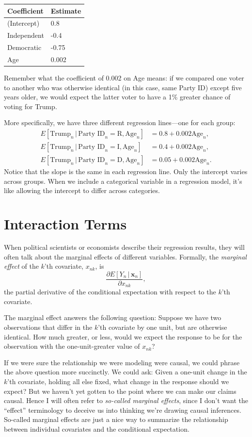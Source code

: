 \documentclass[
  12pt,
  oneside,openany]{book}
\begin{document}
\begin{longtable}[]{@{}ll@{}}
\toprule
Coefficient & Estimate\tabularnewline
\midrule
\endhead
(Intercept) & 0.8\tabularnewline
Independent & -0.4\tabularnewline
Democratic & -0.75\tabularnewline
Age & 0.002\tabularnewline
\bottomrule
\end{longtable}

Remember what the coefficient of 0.002 on Age means: if we compared one voter to another who was otherwise identical (in this case, same Party ID) except five years older, we would expect the latter voter to have a 1\% greater chance of voting for Trump.

More specifically, we have three different regression lines---one for each group:
\[
\begin{aligned}
  E[\text{Trump}_n \,|\, \text{Party ID}_n = \text{R}, \text{Age}_n] &= 0.8 + 0.002 \text{Age}_n, \\
  E[\text{Trump}_n \,|\, \text{Party ID}_n = \text{I}, \text{Age}_n] &= 0.4 + 0.002 \text{Age}_n, \\
  E[\text{Trump}_n \,|\, \text{Party ID}_n = \text{D}, \text{Age}_n] &= 0.05 + 0.002 \text{Age}_n.
\end{aligned}
\]
Notice that the slope is the same in each regression line. Only the intercept varies across groups. When we include a categorical variable in a regression model, it's like allowing the intercept to differ across categories.

\hypertarget{interaction-terms}{%
\section{Interaction Terms}\label{interaction-terms}}

When political scientists or economists describe their regression results, they will often talk about the marginal effects of different variables. Formally, the \emph{marginal effect} of the \(k\)'th covariate, \(x_{nk}\), is
\[
\frac{\partial{}E[Y_n \,|\, \mathbf{x}_n]}{\partial{}x_{nk}},
\]
the partial derivative of the conditional expectation with respect to the \(k\)'th covariate.

The marginal effect answers the following question: Suppose we have two observations that differ in the \(k\)'th covariate by one unit, but are otherwise identical. How much greater, or less, would we expect the response to be for the observation with the one-unit-greater value of \(x_{nk}\)?

If we were sure the relationship we were modeling were causal, we could phrase the above question more succinctly. We could ask: Given a one-unit change in the \(k\)'th covariate, holding all else fixed, what change in the response should we expect? But we haven't yet gotten to the point where we can make our claims causal. Hence I will often refer to \emph{so-called marginal effects}, since I don't want the ``effect'' terminology to deceive us into thinking we're drawing causal inferences. So-called marginal effects are just a nice way to summarize the relationship between individual covariates and the conditional expectation.
\end{document}
